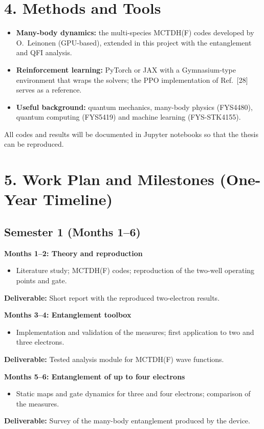 \documentclass[12pt,a4paper]{article}
\begin{document}
\section*{4. Methods and Tools}

\begin{itemize}
  \item \textbf{Many-body dynamics:} the multi-species MCTDH(F) codes
  developed by O.~Leinonen (GPU-based), extended in this project with
  the entanglement and QFI analysis.
  \item \textbf{Reinforcement learning:} PyTorch or JAX with a
  Gymnasium-type environment that wraps the solvers; the PPO
  implementation of Ref.~[28] serves as a reference.
  \item \textbf{Useful background:} quantum mechanics, many-body
  physics (FYS4480), quantum computing (FYS5419) and machine learning
  (FYS-STK4155).
\end{itemize}
All codes and results will be documented in Jupyter notebooks so that
the thesis can be reproduced.

\section*{5. Work Plan and Milestones (One-Year Timeline)}

\subsection*{Semester 1 (Months 1--6)}

\textbf{Months 1--2: Theory and reproduction}
\begin{itemize}
    \item Literature study; MCTDH(F) codes; reproduction of the
    two-well operating points and gate.
\end{itemize}
\textbf{Deliverable:} Short report with the reproduced two-electron
results.

\bigskip

\textbf{Months 3--4: Entanglement toolbox}
\begin{itemize}
    \item Implementation and validation of the measures; first
    application to two and three electrons.
\end{itemize}
\textbf{Deliverable:} Tested analysis module for MCTDH(F) wave
functions.

\bigskip

\textbf{Months 5--6: Entanglement of up to four electrons}
\begin{itemize}
    \item Static maps and gate dynamics for three and four electrons;
    comparison of the measures.
\end{itemize}
\textbf{Deliverable:} Survey of the many-body entanglement produced
by the device.
\end{document}
